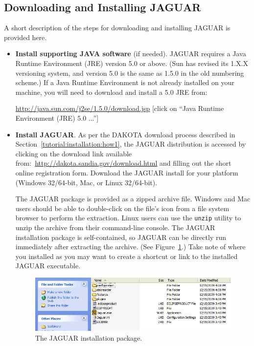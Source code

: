 \subsection{Downloading and Installing JAGUAR}

A short description of the steps for downloading and installing JAGUAR
is provided here.

\begin{itemize}
\item \textbf{Install supporting JAVA software} (if needed).  JAGUAR
  requires a Java Runtime Environment (JRE) version 5.0 or above. (Sun
  has revised its 1.X.X versioning system, and version 5.0 is the same
  as 1.5.0 in the old numbering scheme.)  If a Java Runtime
  Environment is not already installed on your machine, you will need
  to download and install a 5.0 JRE from:

\url{http://java.sun.com/j2se/1.5.0/download.jsp} 
{\small [click on ``Java Runtime Environment (JRE) 5.0 ...'']}

\item \textbf{Install JAGUAR}.  As per the DAKOTA download process
  described in Section~\ref{tutorial:installation:how1}, the JAGUAR
  distribution is accessed by clicking on the download link available
  from:~\url{http://dakota.sandia.gov/download.html} and
  filling out the short online registration form.  Download the JAGUAR
  install for your platform (Windows 32/64-bit, Mac, or Linux 32/64-bit).

The JAGUAR package is provided as a zipped archive file.  Windows and
Mac users should be able to double-click on the file's icon from a
file system browser to perform the extraction.  Linux users can use
the {\tt unzip} utility to unzip the archive from their command-line
console.  The JAGUAR installation package is self-contained, so JAGUAR
can be directly run immediately after extracting the archive. (See
Figure~\ref{fig:input:jag_package}.)  Take note of where you installed
as you may want to create a shortcut or link to the installed JAGUAR 
executable.
\begin{figure}
  \centering
  \includegraphics[scale=0.6]{images/jag_package}
  \caption{The JAGUAR installation package.}
  \label{fig:input:jag_package}
\end{figure}

\end{itemize}


